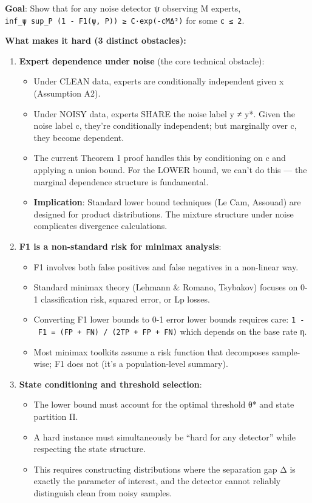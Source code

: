 \documentclass[
  12pt,
]{ctexart}
\providecommand{\tightlist}{%
  \setlength{\itemsep}{0pt}\setlength{\parskip}{0pt}}
\begin{document}
\textbf{Goal}: Show that for any noise detector ψ observing M experts,
\texttt{inf\_ψ\ sup\_P\ (1\ -\ F1(ψ,\ P))\ ≥\ C·exp(-cMΔ²)} for some
\texttt{c\ ≤\ 2}.

\textbf{What makes it hard (3 distinct obstacles):}

\begin{enumerate}
\def\labelenumi{\arabic{enumi}.}
\tightlist
\item
  \textbf{Expert dependence under noise} (the core technical obstacle):

  \begin{itemize}
  \tightlist
  \item
    Under CLEAN data, experts are conditionally independent given x
    (Assumption A2).
  \item
    Under NOISY data, experts SHARE the noise label y ≠ y*. Given the
    noise label c, they're conditionally independent; but marginally
    over c, they become dependent.
  \item
    The current Theorem 1 proof handles this by conditioning on c and
    applying a union bound. For the LOWER bound, we can't do this ---
    the marginal dependence structure is fundamental.
  \item
    \textbf{Implication}: Standard lower bound techniques (Le Cam,
    Assouad) are designed for product distributions. The mixture
    structure under noise complicates divergence calculations.
  \end{itemize}
\item
  \textbf{F1 is a non-standard risk for minimax analysis}:

  \begin{itemize}
  \tightlist
  \item
    F1 involves both false positives and false negatives in a non-linear
    way.
  \item
    Standard minimax theory (Lehmann \& Romano, Tsybakov) focuses on 0-1
    classification risk, squared error, or Lp losses.
  \item
    Converting F1 lower bounds to 0-1 error lower bounds requires care:
    \texttt{1\ -\ F1\ =\ (FP\ +\ FN)\ /\ (2TP\ +\ FP\ +\ FN)} which
    depends on the base rate η.
  \item
    Most minimax toolkits assume a risk function that decomposes
    sample-wise; F1 does not (it's a population-level summary).
  \end{itemize}
\item
  \textbf{State conditioning and threshold selection}:

  \begin{itemize}
  \tightlist
  \item
    The lower bound must account for the optimal threshold θ* and state
    partition Π.
  \item
    A hard instance must simultaneously be ``hard for any detector''
    while respecting the state structure.
  \item
    This requires constructing distributions where the separation gap Δ
    is exactly the parameter of interest, and the detector cannot
    reliably distinguish clean from noisy samples.
  \end{itemize}
\end{enumerate}
\end{document}
